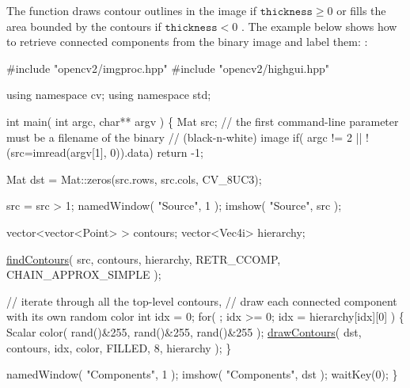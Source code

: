 The function draws contour outlines in the image if $\texttt{thickness} \ge 0$ or fills the area bounded by the contours if $\texttt{thickness}<0$ . The example below shows how to retrieve connected components from the binary image and label them\+: \+: 
\begin{DoxyPre}
\begin{DoxyCode}
\textcolor{preprocessor}{#include "opencv2/imgproc.hpp"}
\textcolor{preprocessor}{#include "opencv2/highgui.hpp"}

\textcolor{keyword}{using namespace }cv;
\textcolor{keyword}{using namespace }std;

\textcolor{keywordtype}{int} main( \textcolor{keywordtype}{int} argc, \textcolor{keywordtype}{char}** argv )
\{
    Mat src;
    \textcolor{comment}{// the first command-line parameter must be a filename of the binary}
    \textcolor{comment}{// (black-n-white) image}
    \textcolor{keywordflow}{if}( argc != 2 || !(src=imread(argv[1], 0)).data)
        \textcolor{keywordflow}{return} -1;

    Mat dst = Mat::zeros(src.rows, src.cols, CV\_8UC3);

    src = src > 1;
    namedWindow( \textcolor{stringliteral}{"Source"}, 1 );
    imshow( \textcolor{stringliteral}{"Source"}, src );

    vector<vector<Point> > contours;
    vector<Vec4i> hierarchy;

    \hyperlink{group__imgproc__shape_gad95c6aa001eb4a24cc898ff08dcb81da}{findContours}( src, contours, hierarchy,
        RETR\_CCOMP, CHAIN\_APPROX\_SIMPLE );

    \textcolor{comment}{// iterate through all the top-level contours,}
    \textcolor{comment}{// draw each connected component with its own random color}
    \textcolor{keywordtype}{int} idx = 0;
    \textcolor{keywordflow}{for}( ; idx >= 0; idx = hierarchy[idx][0] )
    \{
        Scalar color( rand()&255, rand()&255, rand()&255 );
        \hyperlink{group__imgproc__draw_ga7f6b348c865b74b400fb05f3ed22152c}{drawContours}( dst, contours, idx, color, FILLED, 8, hierarchy );
    \}

    namedWindow( \textcolor{stringliteral}{"Components"}, 1 );
    imshow( \textcolor{stringliteral}{"Components"}, dst );
    waitKey(0);
\}
\end{DoxyCode}
 \end{DoxyPre}
 


